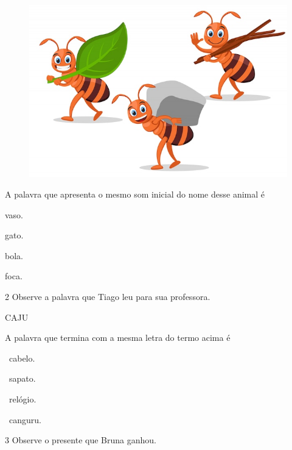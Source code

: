 \begin{figure}[htpb!]
\centering
\includegraphics[width=\textwidth]{media/image42.jpeg}
\end{figure}

A palavra que apresenta o mesmo som inicial do nome desse animal é

\begin{escolha}[itemsep=-3pt]
\item vaso.

\item gato.

\item bola.

\item foca.
\end{escolha}

\pagebreak
\num{2} Observe a palavra que Tiago leu para sua professora.

\begin{myquote}
\centering
CAJU
\end{myquote}

A palavra que termina com a mesma letra do termo acima é

\begin{escolha}[itemsep=-3pt]
\item\ cabelo.

\item\ sapato.

\item\ relógio.

\item\ canguru.
\end{escolha}


\num{3} Observe o presente que Bruna ganhou.

